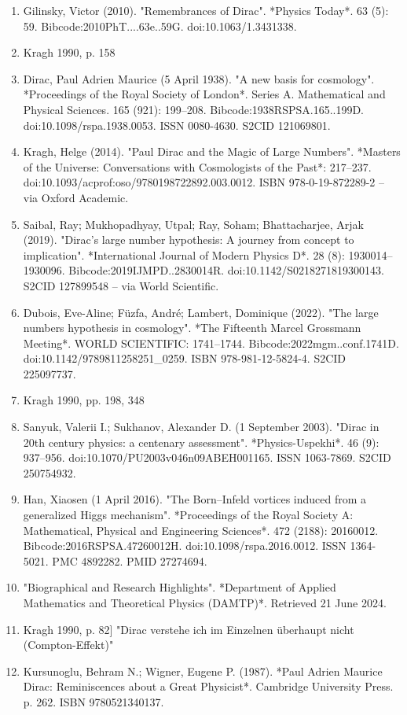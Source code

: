 \begin{enumerate}
\item Gilinsky, Victor (2010). "Remembrances of Dirac". *Physics Today*. 63 (5): 59. Bibcode:2010PhT....63e..59G. doi:10.1063/1.3431338.
\item Kragh 1990, p. 158
\item Dirac, Paul Adrien Maurice (5 April 1938). "A new basis for cosmology". *Proceedings of the Royal Society of London*. Series A. Mathematical and Physical Sciences. 165 (921): 199–208. Bibcode:1938RSPSA.165..199D. doi:10.1098/rspa.1938.0053. ISSN 0080-4630. S2CID 121069801.
\item Kragh, Helge (2014). "Paul Dirac and the Magic of Large Numbers". *Masters of the Universe: Conversations with Cosmologists of the Past*: 217–237. doi:10.1093/acprof:oso/9780198722892.003.0012. ISBN 978-0-19-872289-2 – via Oxford Academic.
\item Saibal, Ray; Mukhopadhyay, Utpal; Ray, Soham; Bhattacharjee, Arjak (2019). "Dirac's large number hypothesis: A journey from concept to implication". *International Journal of Modern Physics D*. 28 (8): 1930014–1930096. Bibcode:2019IJMPD..2830014R. doi:10.1142/S0218271819300143. S2CID 127899548 – via World Scientific.
\item Dubois, Eve-Aline; Füzfa, André; Lambert, Dominique (2022). "The large numbers hypothesis in cosmology". *The Fifteenth Marcel Grossmann Meeting*. WORLD SCIENTIFIC: 1741–1744. Bibcode:2022mgm..conf.1741D. doi:10.1142/9789811258251_0259. ISBN 978-981-12-5824-4. S2CID 225097737.
\item Kragh 1990, pp. 198, 348
\item Sanyuk, Valerii I.; Sukhanov, Alexander D. (1 September 2003). "Dirac in 20th century physics: a centenary assessment". *Physics-Uspekhi*. 46 (9): 937–956. doi:10.1070/PU2003v046n09ABEH001165. ISSN 1063-7869. S2CID 250754932.
\item Han, Xiaosen (1 April 2016). "The Born–Infeld vortices induced from a generalized Higgs mechanism". *Proceedings of the Royal Society A: Mathematical, Physical and Engineering Sciences*. 472 (2188): 20160012. Bibcode:2016RSPSA.47260012H. doi:10.1098/rspa.2016.0012. ISSN 1364-5021. PMC 4892282. PMID 27274694.
\item "Biographical and Research Highlights". *Department of Applied Mathematics and Theoretical Physics (DAMTP)*. Retrieved 21 June 2024.
\item Kragh 1990, p. 82] "Dirac verstehe ich im Einzelnen überhaupt nicht (Compton-Effekt)"
\item Kursunoglu, Behram N.; Wigner, Eugene P. (1987). *Paul Adrien Maurice Dirac: Reminiscences about a Great Physicist*. Cambridge University Press. p. 262. ISBN 9780521340137.

\end{enumerate}
